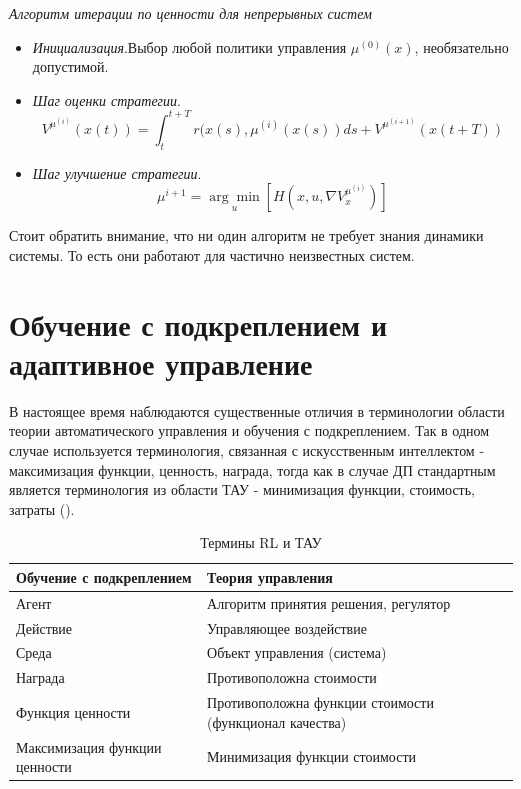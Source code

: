 \textit{Алгоритм итерации по ценности для непрерывных систем}
\begin{itemize}
	\item \textit{Инициализация}.Выбор любой политики управления $\mu ^(0)(x)$, необязательно допустимой.
	\item \textit{Шаг оценки стратегии}.
	\begin{equation}
	V^{\mu^(i)}(x(t)) = \int_t^{t+T} r(x(s), \mu^(i)(x(s))ds + V^{\mu^(i+1)}(x(t+T))
	\end{equation}
	\item \textit{Шаг улучшение стратегии}.
	\begin{equation*}
		\mu^{i+1} = \underset{u}{\arg\min}[H(x, u, \nabla V^{\mu^{(i)}}_x)]
	\end{equation*}
\end{itemize}

Стоит обратить внимание, что ни один алгоритм не требует знания динамики системы. То есть они работают для частично неизвестных систем.

\section{Обучение с подкреплением и адаптивное управление}

В настоящее время наблюдаются существенные отличия в терминологии области теории автоматического управления и обучения с подкреплением. Так в одном случае используется терминология, связанная с искусственным интеллектом - максимизация функции, ценность, награда, тогда как в случае ДП стандартным является терминология из области ТАУ - минимизация функции, стоимость, затраты ().
\begin{table}[h!]
	\centering
	\small
	\caption{Термины RL и ТАУ}
	\begin{tabular}{|l|p{250pt}|}
		\hline
		Обучение с подкреплением & Теория управления \\
		\hline
		Агент &  Алгоритм принятия решения, регулятор \\
		\hline
		Действие & Управляющее воздействие \\
		\hline 
		Среда & Объект управления (система) \\
		\hline
		Награда & Противоположна стоимости \\
		\hline
		Функция ценности & Противоположна функции стоимости (функционал качества) \\
		\hline
		Максимизация функции ценности & Минимизация функции стоимости \\
		\hline
		
	\end{tabular}
	\label{tab:RL_TAC}
\end{table}

